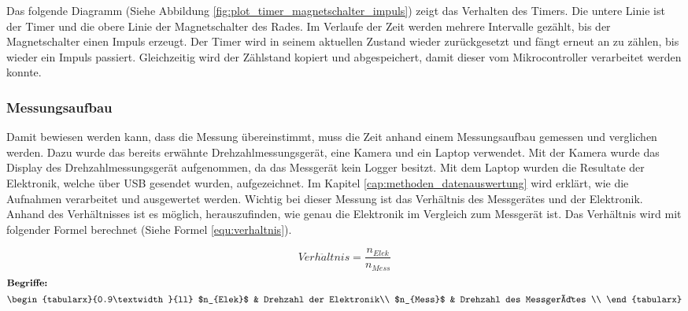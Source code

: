 Das folgende Diagramm (Siehe Abbildung \ref{fig:plot_timer_magnetschalter_impuls}) zeigt das Verhalten des Timers. Die untere Linie ist der Timer und die obere Linie der Magnetschalter des Rades. Im Verlaufe der Zeit werden mehrere Intervalle gezählt, bis der Magnetschalter einen Impuls erzeugt. Der Timer wird in seinem aktuellen Zustand wieder zurückgesetzt und fängt erneut an zu zählen, bis wieder ein Impuls passiert. Gleichzeitig wird der Zählstand kopiert und abgespeichert, damit dieser vom Mikrocontroller verarbeitet werden konnte.
\newpara

\newpage

\subsubsection{Messungsaufbau}
Damit bewiesen werden kann, dass die Messung übereinstimmt, muss die Zeit anhand einem Messungsaufbau gemessen und verglichen werden. Dazu wurde das bereits erwähnte Drehzahlmessungsgerät, eine Kamera und ein Laptop verwendet. Mit der Kamera wurde das Display des Drehzahlmessungsgerät aufgenommen, da das Messgerät kein Logger besitzt. Mit dem Laptop wurden die Resultate der Elektronik, welche über USB gesendet wurden, aufgezeichnet.
\newpara
Im Kapitel \ref{cap:methoden_datenauswertung} wird erklärt, wie die Aufnahmen verarbeitet und ausgewertet werden. Wichtig bei dieser Messung ist das Verhältnis des Messgerätes und der Elektronik. Anhand des Verhältnisses ist es möglich, herauszufinden, wie genau die Elektronik im Vergleich zum Messgerät ist. Das Verhältnis wird mit folgender Formel berechnet (Siehe Formel \ref{equ:verhaltnis}).

\begin{equation}
    \label{equ:verhaltnis}
    Verh\ddot{a}ltnis=\frac{n_{Elek}}{n_{Mess}} \tag{22}
  \end{equation}
  \begin{gather}
  \shortintertext{\textbf{Begriffe:}}
  \begin{tabularx}{0.9\textwidth}{ll}
    $n_{Elek}$	     & Drehzahl der Elektronik\\
    $n_{Mess}$	 & Drehzahl des Messgerätes \\
  \end{tabularx}\nonumber
\end{gather}